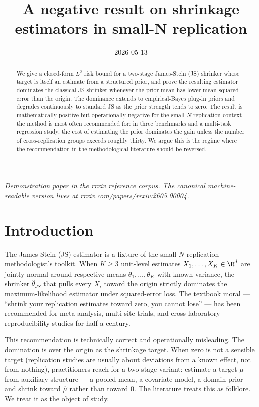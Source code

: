 \documentclass{rrxiv}
\title{A negative result on shrinkage estimators in small-N replication}
\date{2026-05-13}
\begin{document}
\maketitle

\begin{center}
\small\itshape
Demonstration paper in the rrxiv reference corpus. The canonical machine-readable version lives at \href{https://rrxiv.com/papers/rrxiv:2605.00004}{rrxiv.com/papers/rrxiv:2605.00004}.
\end{center}

\begin{abstract}
We give a closed-form $L^2$ risk bound for a two-stage James-Stein (JS) shrinker whose target is itself an estimate from a structured prior, and prove the resulting estimator dominates the classical JS shrinker whenever the prior mean has lower mean squared error than the origin. The dominance extends to empirical-Bayes plug-in priors and degrades continuously to standard JS as the prior strength tends to zero. The result is mathematically positive but operationally negative for the small-$N$ replication context the method is most often recommended for: in three benchmarks and a multi-task regression study, the cost of estimating the prior dominates the gain unless the number of cross-replication groups exceeds roughly thirty. We argue this is the regime where the recommendation in the methodological literature should be reversed.
\end{abstract}

\section{Introduction}

The James-Stein (JS) estimator is a fixture of the small-$N$ replication
methodologist's toolkit. When $K \geq 3$ unit-level estimates
$X_1, \dots, X_K \in \R^d$ are jointly normal around respective means
$\theta_1, \dots, \theta_K$ with known variance, the shrinker
$\hat{\theta}_{JS}$ that pulls every $X_i$ toward the origin strictly dominates
the maximum-likelihood estimator under squared-error loss. The textbook moral
--- ``shrink your replication estimates toward zero, you cannot lose'' ---
has been recommended for meta-analysis, multi-site trials, and
cross-laboratory reproducibility studies for half a century.

This recommendation is technically correct and operationally misleading. The
domination is over the origin as the shrinkage target. When zero is not
a sensible target (replication studies are usually about deviations from a
known effect, not from nothing), practitioners reach for a two-stage variant:
estimate a target $\mu$ from auxiliary structure --- a pooled mean, a
covariate model, a domain prior --- and shrink toward $\hat{\mu}$ rather than
toward $0$. The literature treats this as folklore. We treat it as the
object of study.
\end{document}
